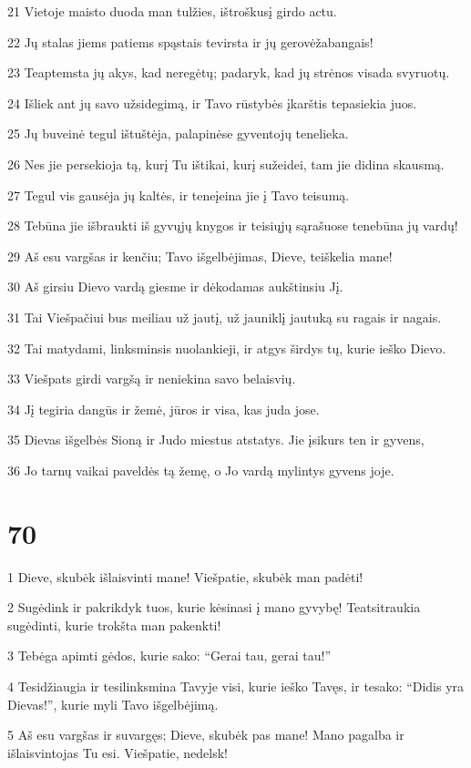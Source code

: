 \par 21 Vietoje maisto duoda man tulžies, ištroškusį girdo actu. 
\par 22 Jų stalas jiems patiems spąstais tevirsta ir jų gerovė­žabangais! 
\par 23 Teaptemsta jų akys, kad neregėtų; padaryk, kad jų strėnos visada svyruotų. 
\par 24 Išliek ant jų savo užsidegimą, ir Tavo rūstybės įkarštis tepasiekia juos. 
\par 25 Jų buveinė tegul ištuštėja, palapinėse gyventojų tenelieka. 
\par 26 Nes jie persekioja tą, kurį Tu ištikai, kurį sužeidei, tam jie didina skausmą. 
\par 27 Tegul vis gausėja jų kaltės, ir teneįeina jie į Tavo teisumą. 
\par 28 Tebūna jie išbraukti iš gyvųjų knygos ir teisiųjų sąrašuose tenebūna jų vardų! 
\par 29 Aš esu vargšas ir kenčiu; Tavo išgelbėjimas, Dieve, teiškelia mane! 
\par 30 Aš girsiu Dievo vardą giesme ir dėkodamas aukštinsiu Jį. 
\par 31 Tai Viešpačiui bus meiliau už jautį, už jauniklį jautuką su ragais ir nagais. 
\par 32 Tai matydami, linksminsis nuolankieji, ir atgys širdys tų, kurie ieško Dievo. 
\par 33 Viešpats girdi vargšą ir neniekina savo belaisvių. 
\par 34 Jį tegiria dangūs ir žemė, jūros ir visa, kas juda jose. 
\par 35 Dievas išgelbės Sioną ir Judo miestus atstatys. Jie įsikurs ten ir gyvens, 
\par 36 Jo tarnų vaikai paveldės tą žemę, o Jo vardą mylintys gyvens joje.



\chapter{70}


\par 1 Dieve, skubėk išlaisvinti mane! Viešpatie, skubėk man padėti! 
\par 2 Sugėdink ir pakrikdyk tuos, kurie kėsinasi į mano gyvybę! Teatsitraukia sugėdinti, kurie trokšta man pakenkti! 
\par 3 Tebėga apimti gėdos, kurie sako: “Gerai tau, gerai tau!” 
\par 4 Tesidžiaugia ir tesilinksmina Tavyje visi, kurie ieško Tavęs, ir tesako: “Didis yra Dievas!”, kurie myli Tavo išgelbėjimą. 
\par 5 Aš esu vargšas ir suvargęs; Dieve, skubėk pas mane! Mano pagalba ir išlaisvintojas Tu esi. Viešpatie, nedelsk!

